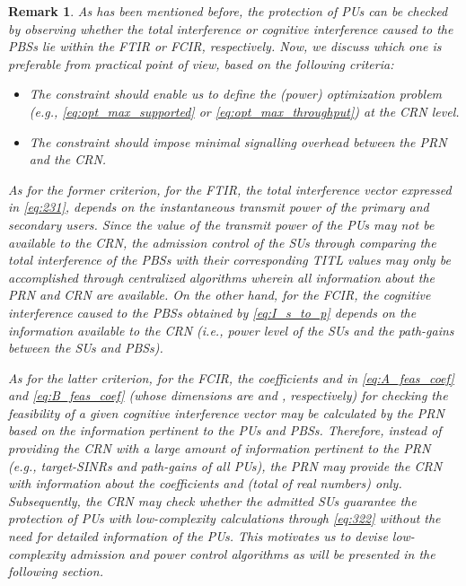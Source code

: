 \documentclass[journal,twoside]{IEEEtran}
\newtheorem {remark}{Remark}
\begin{document}
	\begin{remark}
		\label{rmk:1}
		As has been mentioned before, the protection of PUs can be checked by observing whether the total interference or cognitive interference caused to the PBSs lie within the FTIR or FCIR, respectively. Now, we discuss which one is  preferable from practical point of view, based on the following criteria:

		\begin{itemize}
			\item The constraint should enable us to define the (power) optimization problem (e.g., \eqref{eq:opt_max_supported} or \eqref{eq:opt_max_throughput}) at the CRN level.
			\item The constraint should impose minimal signalling overhead between the PRN and the CRN.
			
		\end{itemize}
		
		As for the former criterion, for the FTIR, the total interference vector  expressed in \eqref{eq:231}, depends on the instantaneous transmit power of the primary and secondary users. Since the value of the transmit power of the PUs may not be available to the CRN, the admission control of the SUs through comparing the total interference of the PBSs with their corresponding TITL values may only be accomplished through centralized algorithms wherein all information about the PRN and CRN are available. On the other hand, for the FCIR, the cognitive interference caused to the PBSs obtained by \eqref{eq:I_s_to_p} depends on the information available to the CRN (i.e., power level of the SUs and the path-gains between the SUs and PBSs).
		 
		As for the latter criterion, for the FCIR, the coefficients  and  in \eqref{eq:A_feas_coef} and \eqref{eq:B_feas_coef} (whose dimensions are  and , respectively) for checking the feasibility of a given cognitive interference vector may be calculated by the PRN based on the information pertinent to the PUs and PBSs. Therefore, instead of providing the CRN with a large amount of information pertinent to the PRN (e.g., target-SINRs and path-gains of all PUs), the PRN may provide the CRN with information about the coefficients  and  (total of  real numbers) only. Subsequently, the CRN may check whether the admitted SUs guarantee the protection of PUs with low-complexity calculations through \eqref{eq:322}  without the need for detailed information of the PUs. This motivates us to devise low-complexity admission and power control algorithms as will be presented in the following section.
	\end{remark}
\end{document}
